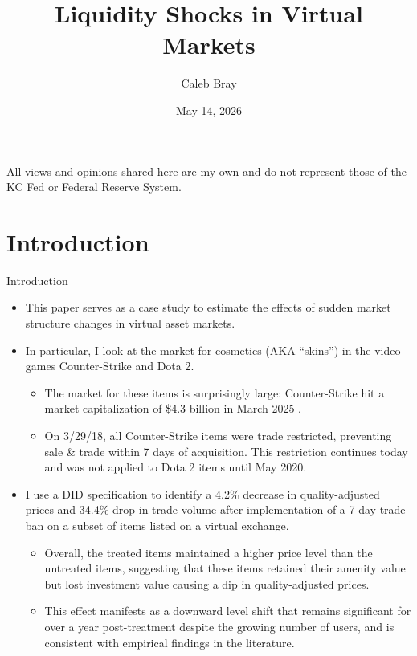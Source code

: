\documentclass[xcolor=table, envcountsect,12pt]{beamer}
\title{Liquidity Shocks in Virtual Markets}
\author{Caleb Bray}
\date{May 14, 2026}
\theoremstyle{remark}
\theoremstyle{theorem}
\theoremstyle{plain}
\begin{document}
	\begin{frame}
		\titlepage
		
		\centering \tiny All views and opinions shared here are my own and do not represent those of the KC Fed or Federal Reserve System.
	\end{frame}

	
	
\section{Introduction}

\begin{frame}[shrink=3]{Introduction}
	\begin{itemize}
		\item \footnotesize This paper serves as a case study to estimate the effects of sudden market structure changes in virtual asset markets.
		\item \footnotesize In particular, I look at the market for cosmetics (AKA ``skins'') in the video games Counter-Strike and Dota 2.
		\begin{itemize}
			\item \scriptsize The market for these items is surprisingly large: Counter-Strike hit a market capitalization of \$4.3 billion in March 2025 \autocite{bloomberg2025-03-07}.
			\item \scriptsize On 3/29/18, all Counter-Strike items were trade restricted, preventing sale \& trade within 7 days of acquisition. This restriction continues today and was not applied to Dota 2 items until May 2020.
		\end{itemize}
		\item \footnotesize I use a DID specification to identify a 4.2\% decrease in quality-adjusted prices and 34.4\% drop in trade volume after implementation of a 7-day trade ban on a subset of items listed on a virtual exchange.
		\begin{itemize}
			\item \scriptsize Overall, the treated items maintained a higher price level than the untreated items, suggesting that these items retained their amenity value but lost investment value causing a dip in quality-adjusted prices.
			\item \scriptsize This effect manifests as a downward level shift that remains significant for over a year post-treatment despite the growing number of users, and is consistent with empirical findings in the literature.
		\end{itemize}
	\end{itemize}
\end{frame}
\end{document}
